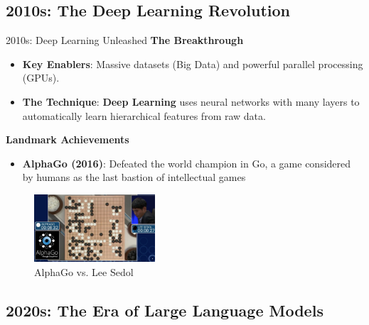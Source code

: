 \documentclass{beamer}
\begin{document}
\subsection{2010s: The Deep Learning Revolution}

\begin{frame}[t]{2010s: Deep Learning Unleashed}
        \textbf{The Breakthrough}
        \begin{itemize}
            \item \textbf{Key Enablers}: Massive datasets (Big Data) and powerful parallel processing (GPUs).
            \item \textbf{The Technique}: \textbf{Deep Learning} uses neural networks with many layers to automatically learn hierarchical features from raw data.
        \end{itemize}
        \textbf{Landmark Achievements}
        \begin{itemize}
            \item \textbf{AlphaGo (2016)}: Defeated the world champion in Go, a game considered by humans as the last bastion of intellectual games
        \end{itemize}
        \begin{figure}
            \includegraphics[width=0.4\textwidth]{images/alphago.jpg}
            \caption{AlphaGo vs. Lee Sedol}
        \end{figure}

\end{frame}

\subsection{2020s: The Era of Large Language Models}
\end{document}
